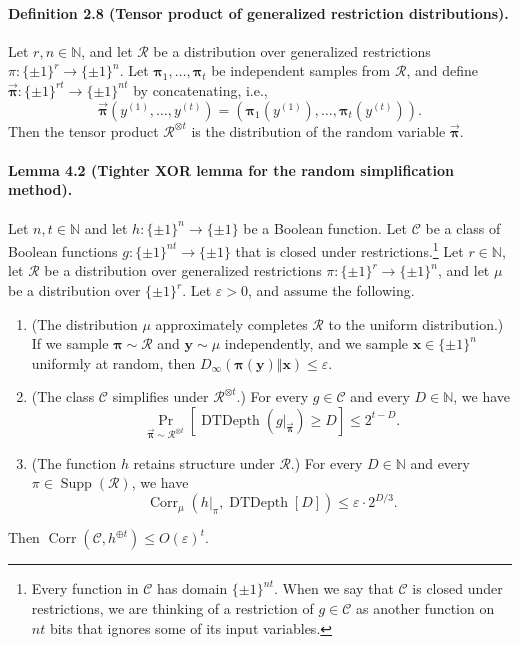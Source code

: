 \documentclass[10pt,a4paper]{article}
\newcommand{\Corr}{\operatorname{Corr}}
\newcommand{\DT}{\operatorname{DTDepth}}
\begin{document}
\paragraph{Definition 2.8 (Tensor product of generalized restriction distributions).} Let $r,n\in\mathbb N$, and let $\mathcal R$ be a distribution over generalized restrictions $\pi:\{\pm1\}^r\to\{\pm1\}^n$. Let $\boldsymbol\pi_1,\ldots,\boldsymbol\pi_t$ be independent samples from $\mathcal R$, and define $\vec{\boldsymbol\pi}:\{\pm1\}^{rt}\to\{\pm1\}^{nt}$ by concatenating, i.e.,
\[\vec{\boldsymbol\pi}(y^{(1)},\ldots,y^{(t)})=(\boldsymbol\pi_1(y^{(1)}),\ldots,\boldsymbol\pi_t(y^{(t)})).\]
Then the tensor product $\mathcal R^{\otimes t}$ is the distribution of the random variable $\vec{\boldsymbol\pi}$.

\paragraph{Lemma 4.2 (Tighter XOR lemma for the random simplification method).}
Let $n,t\in\mathbb N$ and let $h:\{\pm1\}^n\to\{\pm1\}$ be a Boolean function. Let $\mathcal C$ be a class of Boolean functions $g:\{\pm1\}^{nt}\to\{\pm1\}$ that is closed under restrictions.\footnote{Every function in $\mathcal C$ has domain $\{\pm1\}^{nt}$. When we say that $\mathcal C$ is closed under restrictions, we are thinking of a restriction of $g\in\mathcal C$ as another function on $nt$ bits that ignores some of its input variables.} Let $r\in\mathbb N$, let $\mathcal R$ be a distribution over generalized restrictions $\pi:\{\pm1\}^r\to\{\pm1\}^n$, and let $\mu$ be a distribution over $\{\pm1\}^r$. Let $\varepsilon>0$, and assume the following.
\begin{enumerate}
\item (The distribution $\mu$ approximately completes $\mathcal R$ to the uniform distribution.) If we sample $\boldsymbol\pi\sim\mathcal R$ and $\mathbf y\sim\mu$ independently, and we sample $\mathbf x\in\{\pm1\}^n$ uniformly at random, then $D_\infty(\boldsymbol\pi(\mathbf y)\Vert\mathbf x)\le\varepsilon$.
\item (The class $\mathcal C$ simplifies under $\mathcal R^{\otimes t}$.) For every $g\in\mathcal C$ and every $D\in\mathbb N$, we have
\[\Pr_{\vec{\boldsymbol\pi}\sim\mathcal R^{\otimes t}}[\DT(g|_{\vec{\boldsymbol\pi}})\ge D]\le2^{t-D}.\]
\item (The function $h$ retains structure under $\mathcal R$.) For every $D\in\mathbb N$ and every $\pi\in\operatorname{Supp}(\mathcal R)$, we have
\[\Corr_\mu(h|_\pi,\DT[D])\le\varepsilon\cdot2^{D/3}.\]
\end{enumerate}
Then $\Corr(\mathcal C,h^{\oplus t})\le O(\varepsilon)^t$.
\end{document}
